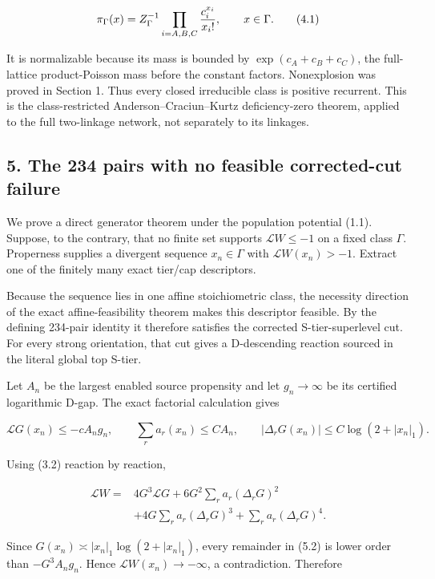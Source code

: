 \[
 \pi_\Gamma(x)=Z_\Gamma^{-1}
       \prod_{i=A,B,C}{c_i^{x_i}\over x_i!},
 \qquad x\in\Gamma.                                  \tag{4.1}
\]

It is normalizable because its mass is bounded by \(\exp(c_A+c_B+c_C)\),
the full-lattice product-Poisson mass before the constant factors.
Nonexplosion was proved in Section 1. Thus every closed irreducible
class is positive recurrent. This is the class-restricted
Anderson--Craciun--Kurtz deficiency-zero theorem, applied to the full
two-linkage network, not separately to its linkages.

\subsection{5. The 234 pairs with no feasible corrected-cut
failure}

We prove a direct generator theorem under the population potential
(1.1). Suppose, to the contrary, that no finite set supports
\(\mathcal LW\le-1\) on a fixed class \(\Gamma\). Properness supplies a
divergent sequence \(x_n\in\Gamma\) with \(\mathcal LW(x_n)>-1\).
Extract one of the finitely many exact tier/cap descriptors.

Because the sequence lies in one affine stoichiometric class, the
necessity direction of the exact affine-feasibility theorem makes this
descriptor feasible. By the defining 234-pair identity it therefore
satisfies the corrected S-tier-superlevel cut. For every strong
orientation, that cut gives a D-descending reaction sourced in the
literal global top S-tier.

Let \(A_n\) be the largest enabled source propensity and let
\(g_n\to\infty\) be its certified logarithmic D-gap. The exact factorial
calculation gives

\[
 \mathcal LG(x_n)\le-cA_ng_n,
 \qquad \sum_r a_r(x_n)\le CA_n,
 \qquad |\Delta_rG(x_n)|\le C\log(2+|x_n|_1).        \tag{5.1}
\]

Using (3.2) reaction by reaction,

\[
\begin{split}
 \mathcal LW={}&4G^3\mathcal LG
 +6G^2\sum_ra_r(\Delta_rG)^2\\
 &+4G\sum_ra_r(\Delta_rG)^3
 +\sum_ra_r(\Delta_rG)^4.
\end{split}                                          \tag{5.2}
\]

Since \(G(x_n)\asymp |x_n|_1\log(2+|x_n|_1)\), every remainder in (5.2)
is lower order than \(-G^3A_ng_n\). Hence
\(\mathcal LW(x_n)\to-\infty\), a contradiction. Therefore

